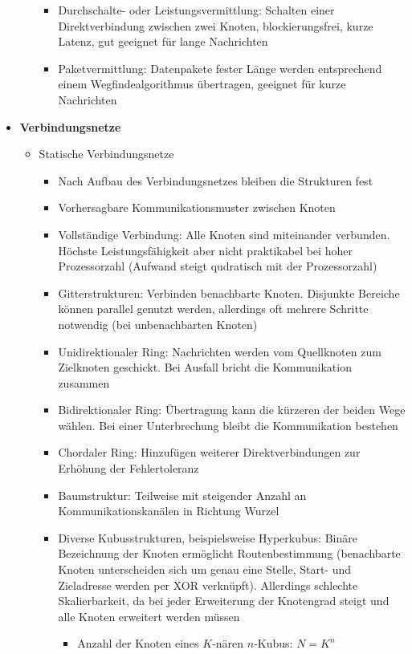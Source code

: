 \begin{itemize}
\begin{itemize}
		\begin{itemize}
			\item Durchschalte- oder Leistungsvermittlung: Schalten einer Direktverbindung zwischen zwei Knoten, blockierungsfrei, kurze Latenz, gut geeignet für lange Nachrichten
			\item Paketvermittlung: Datenpakete fester Länge werden entsprechend einem Wegfindealgorithmus übertragen, geeignet für kurze Nachrichten
		\end{itemize}
	\end{itemize}
	\item \textbf{Verbindungsnetze}
	\begin{itemize}
		\item Statische Verbindungsnetze
		\begin{itemize}
			\item Nach Aufbau des Verbindungsnetzes bleiben die Strukturen fest
			\item Vorhersagbare Kommunikationsmuster zwischen Knoten
			\item Vollständige Verbindung: Alle Knoten sind miteinander verbunden. Höchste Leistungsfähigkeit aber nicht praktikabel bei hoher Prozessorzahl (Aufwand steigt qudratisch mit der Prozessorzahl)
			\item Gitterstrukturen: Verbinden benachbarte Knoten. Disjunkte Bereiche können parallel genutzt werden, allerdings oft mehrere Schritte notwendig (bei unbenachbarten Knoten)
			\item Unidirektionaler Ring: Nachrichten werden vom Quellknoten zum Zielknoten geschickt. Bei Ausfall bricht die Kommunikation zusammen
			\item Bidirektionaler Ring: Übertragung kann die kürzeren der beiden Wege wählen. Bei einer Unterbrechung bleibt die Kommunikation bestehen
			\item Chordaler Ring: Hinzufügen weiterer Direktverbindungen zur Erhöhung der Fehlertoleranz
			\item Baumstruktur: Teilweise mit steigender Anzahl an Kommunikationskanälen in Richtung Wurzel
			\item Diverse Kubusstrukturen, beispielsweise Hyperkubus: Binäre Bezeichnung der Knoten ermöglicht Routenbestimmung (benachbarte Knoten unterscheiden sich um genau eine Stelle, Start- und Zieladresse werden per XOR verknüpft). Allerdings schlechte Skalierbarkeit, da bei jeder Erweiterung der Knotengrad steigt und alle Knoten erweitert werden müssen
			\begin{itemize}
				\item Anzahl der Knoten eines \(K\)-nären \(n\)-Kubus: \(N = K^n\)

\end{itemize}
\end{itemize}
\end{itemize}
\end{itemize}
